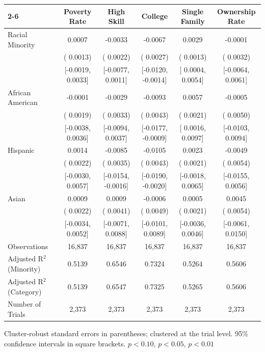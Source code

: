 \begin{table}[!htbp]
{\begin{tabular}{lccccc}
\cmidrule(lr){2-6}
& Poverty Rate & High Skill & College & Single Family & Ownership Rate \\
\midrule
Racial Minority &  0.0007 & -0.0033 & -0.0067\sym{**} &  0.0029\sym{**} & -0.0001  \\
 & ( 0.0013) & ( 0.0022) & ( 0.0027) & ( 0.0013) & ( 0.0032)  \\
 & [-0.0019,  0.0033] & [-0.0077,  0.0011] & [-0.0120, -0.0014] & [ 0.0004,  0.0054] & [-0.0064,  0.0061]  \\
African American & -0.0001 & -0.0029 & -0.0093\sym{**} &  0.0057\sym{***} & -0.0005  \\
 & ( 0.0019) & ( 0.0033) & ( 0.0043) & ( 0.0021) & ( 0.0050)  \\
 & [-0.0038,  0.0036] & [-0.0094,  0.0037] & [-0.0177, -0.0009] & [ 0.0016,  0.0097] & [-0.0103,  0.0094]  \\
Hispanic &  0.0014 & -0.0085\sym{**} & -0.0105\sym{**} &  0.0023 & -0.0049  \\
 & ( 0.0022) & ( 0.0035) & ( 0.0043) & ( 0.0021) & ( 0.0054)  \\
 & [-0.0030,  0.0057] & [-0.0154, -0.0016] & [-0.0190, -0.0020] & [-0.0018,  0.0065] & [-0.0155,  0.0056]  \\
Asian &  0.0009 &  0.0009 & -0.0006 &  0.0005 &  0.0045  \\
 & ( 0.0022) & ( 0.0041) & ( 0.0049) & ( 0.0021) & ( 0.0054)  \\
 & [-0.0034,  0.0052] & [-0.0071,  0.0088] & [-0.0101,  0.0089] & [-0.0036,  0.0046] & [-0.0061,  0.0150]  \\
\midrule
Observations & 16{,}837 & 16{,}837 & 16{,}837 & 16{,}837 & 16{,}837\\
Adjusted R$^2$ (Minority) & 0.5139 & 0.6546 & 0.7324 & 0.5264 & 0.5606\\
Adjusted R$^2$ (Category) & 0.5139 & 0.6547 & 0.7325 & 0.5265 & 0.5606\\
Number of Trials & 2{,}373 & 2{,}373 & 2{,}373 & 2{,}373 & 2{,}373\\
\bottomrule
\end{tabular}
}
\begin{minipage}{\textwidth}
\footnotesize
Cluster-robust standard errors in parentheses; clustered at the trial level. 95\% confidence intervals in square brackets.
\sym{*} \(p<0.10\), \sym{**} \(p<0.05\), \sym{***} \(p<0.01\)
\end{minipage}
\end{table}

